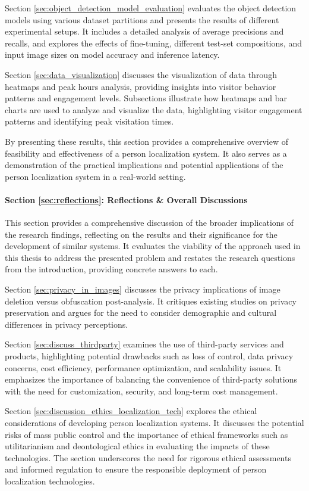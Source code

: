 Section \ref{sec:object_detection_model_evaluation} evaluates the object detection models using various dataset partitions and presents the results of different experimental setups. It includes a detailed analysis of average precisions and recalls, and explores the effects of fine-tuning, different test-set compositions, and input image sizes on model accuracy and inference latency.

Section \ref{sec:data_visualization} discusses the visualization of data through heatmaps and peak hours analysis, providing insights into visitor behavior patterns and engagement levels. Subsections illustrate how heatmaps and bar charts are used to analyze and visualize the data, highlighting visitor engagement patterns and identifying peak visitation times.

By presenting these results, this section provides a comprehensive overview of feasibility and effectiveness of a person localization system. It also serves as a demonstration of the practical implications and potential applications of the person localization system in a real-world setting.


\paragraph{Section \ref{sec:reflections}: Reflections \& Overall Discussions} 
This section provides a comprehensive discussion of the broader implications of the research findings, reflecting on the results and their significance for the development of similar systems. It evaluates the viability of the approach used in this thesis to address the presented problem and restates the research questions from the introduction, providing concrete answers to each.

Section \ref{sec:privacy_in_images} discusses the privacy implications of image deletion versus obfuscation post-analysis. It critiques existing studies on privacy preservation and argues for the need to consider demographic and cultural differences in privacy perceptions.

Section \ref{sec:discuss_thirdparty} examines the use of third-party services and products, highlighting potential drawbacks such as loss of control, data privacy concerns, cost efficiency, performance optimization, and scalability issues. It emphasizes the importance of balancing the convenience of third-party solutions with the need for customization, security, and long-term cost management.

Section \ref{sec:discussion_ethics_localization_tech} explores the ethical considerations of developing person localization systems. It discusses the potential risks of mass public control and the importance of ethical frameworks such as utilitarianism and deontological ethics in evaluating the impacts of these technologies. The section underscores the need for rigorous ethical assessments and informed regulation to ensure the responsible deployment of person localization technologies.

